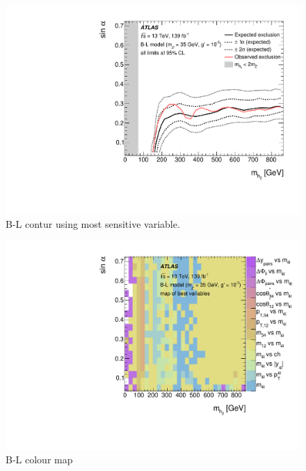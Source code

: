 \begin{figure}
    \centering
    \includegraphics[width=\mediumfigwidth]{Figures/m4l/Interpretations/UpperLimitBandWithContour_2D_withTheoExcl.pdf}
    \caption{B-L contur using most sensitive variable.}
    \label{fig:BLcontour}
\end{figure}
\begin{figure}
    \centering
    \includegraphics[width=\mediumfigwidth]{Figures/m4l/Interpretations/UpperLimitBandWithContour_2D_colormap.pdf}
    \caption{B-L colour map}
    \label{fig:BLcolourmap}
\end{figure}